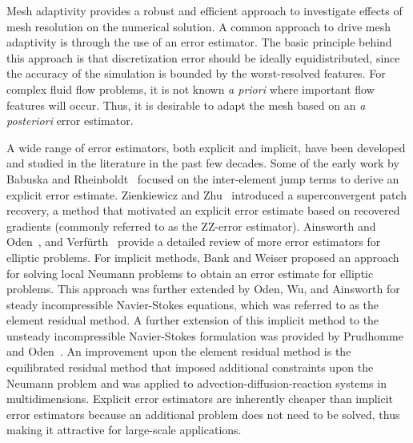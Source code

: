 Mesh adaptivity provides a robust and efficient approach to investigate effects of mesh resolution on the numerical solution.
A common approach to drive mesh adaptivity is through the use of an error estimator.
The basic principle behind this approach is that discretization error should be ideally equidistributed, since the accuracy of the simulation is bounded by the worst-resolved features.
For complex fluid flow problems, it is not known \textit{a priori} where important flow features will occur. Thus, it is desirable to adapt the mesh based on an \textit{a posteriori} error estimator.

A wide range of error estimators, both explicit and implicit, have been developed and studied in the literature in the past few decades.
Some of the early work by Babuska and Rheinboldt~\cite{babuvska1978posteriori} focused on the inter-element jump terms to derive an explicit error estimate.
Zienkiewicz and Zhu~\cite{zienkiewicz1992superconvergent1,zienkiewicz1992superconvergent2} introduced a superconvergent patch recovery, a method that motivated an explicit error estimate based on recovered gradients (commonly referred to as the ZZ-error estimator).
Ainsworth and Oden~\cite{ainsworth2011book}, and Verf\"urth~\cite{verfurth1994posteriori} provide a detailed review of more error estimators for elliptic problems.
For implicit methods, Bank and Weiser \cite{bank1985some} proposed an approach for solving local Neumann problems to obtain an error estimate for elliptic problems.
This approach was further extended by Oden, Wu, and Ainsworth \cite{oden1994posteriori} for steady incompressible Navier-Stokes equations, which was referred to as the element residual method.
A further extension of this implicit method to the unsteady incompressible Navier-Stokes formulation was provided by Prudhomme and Oden~\cite{prudhomme1999posteriori}.
An improvement upon the element residual method is the equilibrated residual method that imposed additional constraints upon the Neumann problem \cite{ainsworth2013fully} and was applied to advection-diffusion-reaction systems in multidimensions.
Explicit error estimators are inherently cheaper than implicit error estimators because an additional problem does not need to be solved, thus making it attractive for large-scale applications.

